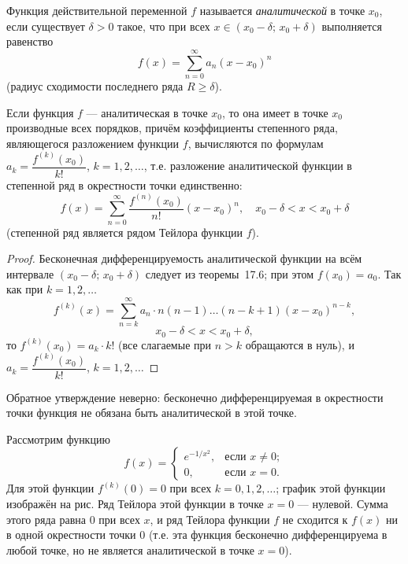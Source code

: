 \begin{defn}
Функция действительной переменной $f$ называется \emph{аналитической} в точке $x_0$, 
если существует $\delta > 0$ такое, что при всех $x \in (x_0 - \delta;\, x_0 + \delta)$ 
выполняется равенство
\[
f(x) = \sum_{n=0}^{\infty} a_n (x - x_0)^n
\]
(радиус сходимости последнего ряда $R \geqslant \delta$).
\end{defn}

\begin{thm} \label{ch13.4thm1}
Если функция $f$ — аналитическая в точке $x_0$, то она имеет в точке $x_0$ 
производные всех порядков, причём коэффициенты степенного ряда, являющегося 
разложением функции $f$, вычисляются по формулам 
$a_k = \dfrac{f^{(k)}(x_0)}{k!}$, $k = 1, 2, \ldots$, т.е. разложение аналитической 
функции в степенной ряд в окрестности точки единственно:
\[
f(x) = \sum_{n=0}^{\infty} \frac{f^{(n)}(x_0)}{n!} (x - x_0)^n, 
\quad x_0 - \delta < x < x_0 + \delta
\]
(степенной ряд является рядом Тейлора функции $f$).
\end{thm}

\begin{proof}
Бесконечная дифференцируемость аналитической функции на всём интервале 
$(x_0 - \delta;\, x_0 + \delta)$ следует из теоремы~17.6; при этом $f(x_0) = a_0$. 
Так как при $k = 1, 2, \ldots$
\[
f^{(k)}(x) = \sum_{n=k}^{\infty} a_n \cdot n(n-1) \ldots (n - k + 1)(x - x_0)^{n-k},
\]
\[
x_0 - \delta < x < x_0 + \delta,
\]
то $f^{(k)}(x_0) = a_k \cdot k!$ (все слагаемые при $n > k$ обращаются в нуль), 
и $a_k = \dfrac{f^{(k)}(x_0)}{k!}$, $k = 1, 2, \ldots$ 
\end{proof}

\medskip
Обратное утверждение неверно: бесконечно дифференцируемая в окрестности точки 
функция не обязана быть аналитической в этой точке.

\begin{notion}
Рассмотрим функцию
\[
f(x) = 
\begin{cases}
e^{-1/x^2}, & \text{если } x \neq 0; \\
0, & \text{если } x = 0.
\end{cases}
\]
Для этой функции $f^{(k)}(0) = 0$ при всех $k = 0, 1, 2, \ldots$; график этой функции изображён на рис. 
Ряд Тейлора этой функции в точке $x = 0$ — 
нулевой. Сумма этого ряда равна $0$ при всех $x$, и ряд Тейлора функции $f$ 
не сходится к $f(x)$ ни в одной окрестности точки $0$ (т.е. эта функция 
бесконечно дифференцируема в любой точке, но не является аналитической в 
точке $x = 0$).
\end{notion}

